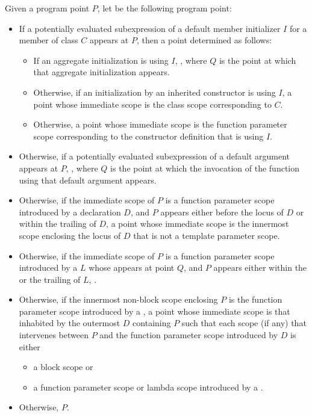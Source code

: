 \begin{itemdescr}
\pnum
Given a program point $P$,
let  be the following program point:
\begin{itemize}
\item
  If a potentially evaluated subexpression
  of a default member initializer $I$
  for a member of class $C$
  appears at $P$,
  then a point determined as follows:
  \begin{itemize}
  \item
    If an aggregate initialization is using $I$,
    ,
    where $Q$ is the point at which that aggregate initialization appears.
  \item
    Otherwise, if an initialization
    by an inherited constructor is using $I$,
    a point whose immediate scope is the class scope corresponding to $C$.
  \item
    Otherwise, a point whose immediate scope
    is the function parameter scope
    corresponding to the constructor definition that is using $I$.
  \end{itemize}
  \item
    Otherwise, if a potentially evaluated subexpression
    of a default argument appears at $P$,
    ,
    where $Q$ is the point at which the invocation of the function
    using that default argument appears.
  \item
    Otherwise, if the immediate scope of $P$
    is a function parameter scope introduced by a declaration $D$,
    and $P$ appears either before the locus of $D$
    or within the trailing  of $D$,
    a point whose immediate scope is the innermost scope enclosing the locus of $D$
    that is not a template parameter scope.
  \item
    Otherwise, if the immediate scope of $P$
    is a function parameter scope
    introduced by a  $L$
    whose  appears at point $Q$,
    and $P$ appears either within the 
    or the trailing  of $L$,
    .
  \item
    Otherwise, if the innermost non-block scope enclosing $P$
    is the function parameter scope
    introduced by a ,
    a point whose immediate scope is that inhabited
    by the outermost  $D$
    containing $P$ such that each scope (if any) that intervenes between $P$
    and the function parameter scope introduced by $D$ is either
    \begin{itemize}
    \item
      a block scope or
    \item
      a function parameter scope or lambda scope
      introduced by a .
    \end{itemize}
  \item
    Otherwise, $P$.
\end{itemize}


\end{itemdescr}
